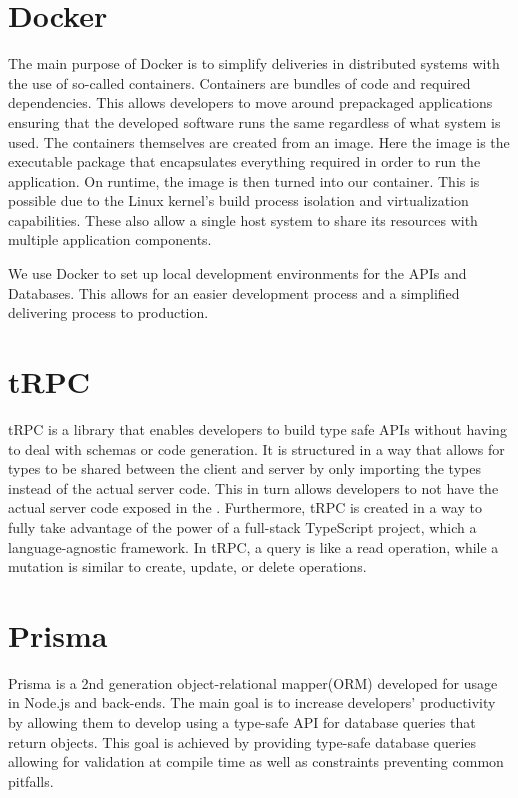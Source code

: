 \section*{Docker}
The main purpose of Docker is to simplify deliveries in distributed systems with the use of so-called containers\cite{Docker_Container}.
Containers are bundles of code and required dependencies. This allows developers to move around prepackaged applications ensuring that the developed software runs the same regardless of what system is used\cite{Docker_Container}.
The containers themselves are created from an image. Here the image is the executable package that encapsulates everything required in order to run the application. On runtime, the image is then turned into our container. 
This is possible due to the Linux kernel's build process isolation and virtualization capabilities. These also allow a single host system to share its resources with multiple application components\cite{Docker_Container}.

We use Docker to set up local development environments for the APIs and Databases. This allows for an easier development process and a simplified delivering process to production.

\section*{tRPC}
tRPC is a library that enables developers to build type safe APIs without having to deal with schemas or code generation. 
It is structured in a way that allows for types to be shared between the client and server by only importing the types instead of the actual server code. 
This in turn allows developers to not have the actual server code exposed in the \frontend{}. 
Furthermore, tRPC is created in a way to fully take advantage of the power of a full-stack TypeScript project, which a language-agnostic framework\cite{tRPC}.
In tRPC, a query is like a read operation, while a mutation is similar to create, update, or delete operations.

\section*{Prisma}
Prisma is a 2nd generation object-relational mapper(ORM) developed for usage in Node.js and \typescript{} back-ends. 
The main goal is to increase developers' productivity by allowing them to develop using a type-safe API for database queries that return \javascript{} objects. 
This goal is achieved by providing type-safe database queries allowing for validation at compile time as well as constraints preventing common pitfalls\cite{Prisma_Why}.
	
